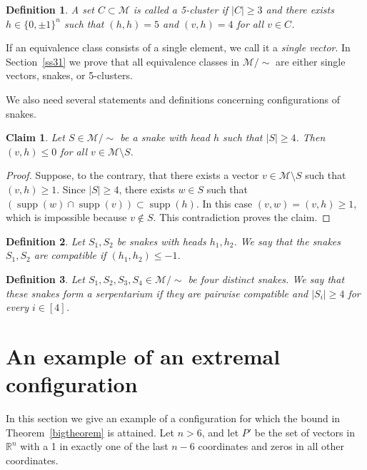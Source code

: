 \documentclass[12pt,a4paper]{article}
\newcommand{\M}{\mathcal{M}}
\newcommand{\T}{\mathcal{T}}
\DeclareMathOperator{\supp}{supp}
\newtheorem{definition}{Definition}
\newtheorem{claim}[theorem]{Claim}
\begin{document}
\begin{definition}
    A set $C \subset \M$ is called a 5-cluster if $|C| \geqslant 3$ and there exists $h \in \{0,\pm 1\}^n$ such that
    $(h, h) = 5$ and $(v, h) = 4$ for all $v \in C$.
\end{definition}

If an equivalence class consists of a single element, we call it a \textit{single vector}. In Section~\ref{ss31} we prove that all equivalence classes in $\M/\sim$ are either single vectors, snakes, or 5-clusters.


We also need several statements and definitions concerning configurations of snakes.

\begin{claim}\label{prop42}
    Let $S \in \M/\sim$ be a snake with head $h$ such that $|S| \geqslant 4$. Then $(v, h) \leqslant 0$ for all $v \in \M \setminus S$.
\end{claim}

\begin{proof}
    Suppose, to the contrary, that there exists a vector $ v \in \M \setminus S$ such that $(v,h) \geqslant 1$. Since $|S| \geqslant 4$, there exists $w \in S$ such that $(\supp(w) \cap \supp(v)) \subset \supp(h)$. In this case $(v,w)=(v,h) \geqslant 1$, which is impossible because $v \notin S$. This contradiction proves the claim.
\end{proof}

\begin{definition}
    Let $S_1, S_2$ be snakes with heads $h_1, h_2$. We say that the snakes $S_1, S_2$ are \textit{compatible} if $(h_1, h_2) \leqslant -1$.
\end{definition}

\begin{definition}
    Let $S_1, S_2, S_3, S_4 \in \M/\sim$ be four distinct snakes. We say that these snakes form a serpentarium if they are pairwise compatible and $|S_i| \geqslant 4$ for every $i \in [4]$.
\end{definition}

\section{An example of an extremal configuration}
In this section we give an example of a configuration for which the bound in Theorem~\ref{bigtheorem} is attained. Let $n>6$, and let $P'$ be the set of vectors in $\mathbb R^n$ with a 1 in exactly one of the last $n-6$ coordinates and zeros in all other coordinates.
\end{document}
